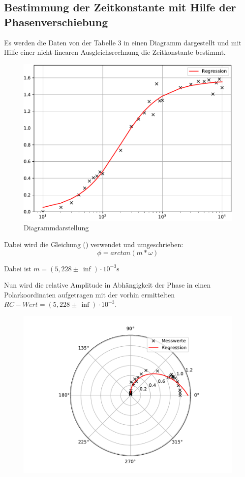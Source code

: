 \subsection{Bestimmung der Zeitkonstante mit Hilfe der Phasenverschiebung}
Es werden die Daten von der Tabelle 3 in einen Diagramm dargestellt und mit Hilfe
einer nicht-linearen Ausgleichsrechnung die Zeitkonstante bestimmt.

\begin{figure}[H]
  \centering
  \includegraphics[width=\textwidth]{Diagramm3.pdf}
  \caption{Diagrammdarstellung}
  \label{fig:3}
\end{figure}
Dabei wird die Gleichung () verwendet und umgeschrieben:
\begin{equation*}
  \phi= arctan(m*\omega)
\end{equation*}
\centerline{Dabei ist $m=(5,228 \pm \, \inf) \cdot 10^{-3} \si{\second}$}
Nun wird die relative Amplitude in Abhängigkeit der Phase in einen Polarkoordinaten aufgetragen mit
der vorhin ermittelten $RC-Wert = (5,228 \pm \, \inf) \cdot 10^{-3}$.
\begin{figure}[H]
  \centering
  \includegraphics[width=\textwidth]{Polar.pdf}
  \label{fig:4}
\end{figure}
